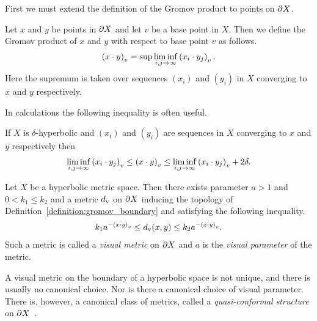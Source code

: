 First we must extend the definition of the Gromov product to points on $\boundary X$.

\begin{definition}
  Let $x$ and $y$ be points in $\boundary X$ and let $v$ be a base point in $X$.
  Then we define the Gromov product of $x$ and $y$ with respect to base point $v$ as follows.
  \begin{align}
    \gromprod[v]{x}{y} = \sup\liminf_{i,j \to \infty}\gromprod[v]{x_i}{y_j}.
  \end{align}
  Here the supremum is taken over sequences $(x_i)$ and $(y_i)$ in $X$ converging to $x$ and $y$ respectively.
\end{definition}

In calculations the following inequality is often useful.

\begin{lemma}\cite[Remarque 8.9]{ghysdelaharpe90}\label{lemma:gromov_product_inequality}
  If $X$ is $\delta$-hyperbolic and $(x_i)$ and $(y_i)$ are sequences in $X$ converging to $x$ and $y$ respectively then
  \begin{align}
    \liminf_{i,j \to \infty}\gromprod[v]{x_i}{y_j} \leq \gromprod[v]{x}{y} \leq \liminf_{i,j \to \infty}\gromprod[v]{x_i}{y_j} + 2\delta.
  \end{align}
\end{lemma}

\begin{proposition}\label{proposition:visual_metric}\cite[Section 7.3]{ghysdelaharpe90}
  Let $X$ be a hyperbolic metric space.
  Then there exists parameter $a > 1$ and $0 < k_1 \leq k_2$ and a metric $d_\rmv$ on $\boundary X$ inducing the topology of Definition~\ref{definition:gromov_boundary} and satisfying the following inequality.
  \begin{align}
    k_1 a^{-\gromprod[v]{x}{y}} \leq d_\rmv(x,y) \leq k_2 a^{-\gromprod[v]{x}{y}}.
  \end{align} 
  Such a metric is called a \emph{visual metric} on $\boundary X$ and $a$ is the \emph{visual parameter} of the metric.
\end{proposition}

\begin{remark}
  A visual metric on the boundary of a hyperbolic space is not unique, and there is usually no canonical choice.
  Nor is there a canonical choice of visual parameter.
  There is, however, a canonical class of metrics, called a \emph{quasi-conformal structure} on $\boundary X$~\cite{pansu89}.
\end{remark}

